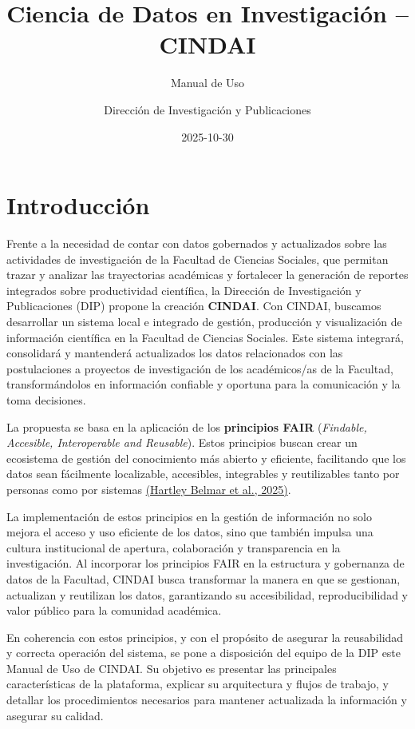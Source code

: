 \documentclass[
  spanish,
  letterpaper,
  DIV=11,
  numbers=noendperiod]{scrreprt}
\title{Ciencia de Datos en Investigación -- CINDAI}
\subtitle{Manual de Uso}
\author{Dirección de Investigación y Publicaciones}
\date{2025-10-30}
\renewcommand*\contentsname{Tabla de contenidos}
\newcommand\contentsname{Tabla de contenidos}
\begin{document}
\maketitle

\renewcommand*\contentsname{Tabla de contenidos}
{
\hypersetup{linkcolor=}
\setcounter{tocdepth}{2}
\tableofcontents
}


\chapter{Introducción}\label{introducciuxf3n}

Frente a la necesidad de contar con datos gobernados y actualizados
sobre las actividades de investigación de la Facultad de Ciencias
Sociales, que permitan trazar y analizar las trayectorias académicas y
fortalecer la generación de reportes integrados sobre productividad
científica, la Dirección de Investigación y Publicaciones (DIP) propone
la creación \textbf{CINDAI}. Con CINDAI, buscamos desarrollar un sistema
local e integrado de gestión, producción y visualización de información
científica en la Facultad de Ciencias Sociales. Este sistema integrará,
consolidará y mantenderá actualizados los datos relacionados con las
postulaciones a proyectos de investigación de los académicos/as de la
Facultad, transformándolos en información confiable y oportuna para la
comunicación y la toma decisiones.

La propuesta se basa en la aplicación de los \textbf{principios FAIR}
(\emph{Findable, Accesible, Interoperable and Reusable}). Estos
principios buscan crear un ecosistema de gestión del conocimiento más
abierto y eficiente, facilitando que los datos sean fácilmente
localizable, accesibles, integrables y reutilizables tanto por personas
como por sistemas \href{https://zenodo.org/records/15856492}{(Hartley
Belmar et al., 2025)}.

La implementación de estos principios en la gestión de información no
solo mejora el acceso y uso eficiente de los datos, sino que también
impulsa una cultura institucional de apertura, colaboración y
transparencia en la investigación. Al incorporar los principios FAIR en
la estructura y gobernanza de datos de la Facultad, CINDAI busca
transformar la manera en que se gestionan, actualizan y reutilizan los
datos, garantizando su accesibilidad, reproducibilidad y valor público
para la comunidad académica.

En coherencia con estos principios, y con el propósito de asegurar la
reusabilidad y correcta operación del sistema, se pone a disposición del
equipo de la DIP este Manual de Uso de CINDAI. Su objetivo es presentar
las principales características de la plataforma, explicar su
arquitectura y flujos de trabajo, y detallar los procedimientos
necesarios para mantener actualizada la información y asegurar su
calidad.
\end{document}
